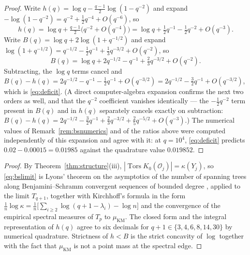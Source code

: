 \documentclass[11pt]{amsart}
\numberwithin{equation}{section}
\theoremstyle{definition}
\theoremstyle{remark}
\newcommand{\cO}{\mathcal{O}}
\newcommand{\Tors}{\operatorname{Tors}}
\begin{document}
\begin{proof}
Write $h(q)=\log q-\tfrac{q-1}2\log(1-q^{-2})$ and expand
$-\log(1-q^{-2})=q^{-2}+\tfrac12q^{-4}+O(q^{-6})$, so
\[
h(q)=\log q+\tfrac{q-1}2\bigl(q^{-2}+O(q^{-4})\bigr)
=\log q+\tfrac12q^{-1}-\tfrac12q^{-2}+O(q^{-3}) .
\]
Write $B(q)=\log q+2\log(1+q^{-1/2})$ and expand
$\log(1+q^{-1/2})=q^{-1/2}-\tfrac12q^{-1}+\tfrac13q^{-3/2}+O(q^{-2})$, so
\[
B(q)=\log q+2q^{-1/2}-q^{-1}+\tfrac23q^{-3/2}+O(q^{-2}) .
\]
Subtracting, the $\log q$ terms cancel and
$B(q)-h(q)=2q^{-1/2}-q^{-1}-\tfrac12q^{-1}+O(q^{-3/2})
=2q^{-1/2}-\tfrac32q^{-1}+O(q^{-3/2})$, which is \eqref{eq:deficit}. (A direct
computer-algebra expansion confirms the next two orders as well, and that the
$q^{-2}$ coefficient vanishes identically --- the $-\tfrac12q^{-2}$ term present in
$B(q)$ and in $h(q)$ separately cancels exactly on subtraction:
$B(q)-h(q)=2q^{-1/2}-\tfrac32q^{-1}+\tfrac23q^{-3/2}+\tfrac25q^{-5/2}+O(q^{-3})$.) The
numerical values of Remark~\ref{rem:bsnumerics} and of the ratios above were computed
independently of this expansion and agree with it: at $q=10^4$, \eqref{eq:deficit}
predicts $0.02-0.00015=0.01985$ against the quadrature value $0.019852$.
\end{proof}

\begin{proof}[Proof]
By Theorem~\ref{thm:structure}(iii), $|\Tors K_0(\cO_j)|=\kappa(Y_j)$, so
\eqref{eq:bslimit} is Lyons' theorem on the asymptotics of the number of spanning trees
along Benjamini--Schramm convergent sequences of bounded degree \cite{Lyons2005},
applied to the limit $T_{q+1}$, together with Kirchhoff's formula in the form
$\frac1n\log\kappa=\frac1n\bigl[\sum_{i\ge2}\log(q+1-\lambda_i)-\log n\bigr]$ and the
convergence of the empirical spectral measures of $T_p$ to $\mu_{\mathrm{KM}}$. The
closed form and the integral representation of $h(q)$ agree to six decimals for
$q+1\in\{3,4,6,8,14,30\}$ by numerical quadrature. Strictness of $h<B$ is the strict
concavity of $\log$ together with the fact that $\mu_{\mathrm{KM}}$ is not a point mass
at the spectral edge.
\end{proof}
\end{document}
